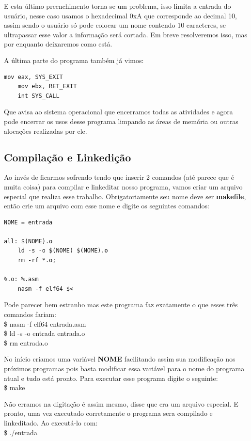 E esta último preenchimento torna-se um problema, isso limita a entrada do usuário, nesse caso usamos o hexadecimal 0xA que corresponde ao decimal 10, assim sendo o usuário só pode colocar um nome contendo 10 caracteres, se ultrapassar esse valor a informação será cortada. Em breve resolveremos isso, mas por enquanto deixaremos como está.

A última parte do programa também já vimos:
\begin{lstlisting}[]
	mov eax, SYS_EXIT
	mov ebx, RET_EXIT
	int SYS_CALL
\end{lstlisting}

Que avisa ao sistema operacional que encerramos todas as atividades e agora pode encerrar os usos desse programa limpando as áreas de memória ou outras alocações realizadas por ele.

\subsection{Compilação e Linkedição}

Ao invés de ficarmos sofrendo tendo que inserir 2 comandos (até parece que é muita coisa) para compilar e linkeditar nosso programa, vamos criar um arquivo especial que realiza esse trabalho. Obrigatoriamente seu nome deve ser \textbf{makefile}, então crie um arquivo com esse nome e digite os seguintes comandos:
\begin{lstlisting}[]
NOME = entrada

all: $(NOME).o
	ld -s -o $(NOME) $(NOME).o
	rm -rf *.o;

%.o: %.asm
	nasm -f elf64 $<
\end{lstlisting}

Pode parecer bem estranho mas este programa faz exatamente o que esses três comandos fariam: \\
{\ttfamily\$ nasm -f elf64 entrada.asm} \\
{\ttfamily\$ ld -s -o entrada entrada.o} \\
{\ttfamily\$ rm entrada.o}

No início criamos uma variável \textbf{NOME} facilitando assim sua modificação nos próximos programas pois basta modificar essa variável para o nome do programa atual e tudo está pronto. Para executar esse programa digite o seguinte: \\
{\ttfamily\$ make}

Não erramos na digitação é assim mesmo, disse que era um arquivo especial. E pronto, uma vez executado corretamente o programa sera compilado e linkeditado. Ao executá-lo com: \\
{\ttfamily\$ ./entrada}

